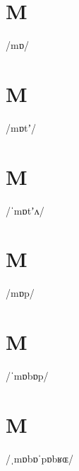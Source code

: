 \documentclass[10pt,a4paper,twoside]{book}
\begin{document}
\section*{M}

\begin{multicols}{3}
 {/mɒ/} {}
\end{multicols}

\section*{M}

\begin{multicols}{3}
 {/mɒtʼ/} {}
\end{multicols}

\section*{M}

\begin{multicols}{3}
 {/ˈmɒtʼʌ/} {}
\end{multicols}

\section*{M}

\begin{multicols}{3}
 {/mɒp/} {}
\end{multicols}

\section*{M}

\begin{multicols}{3}
 {/ˈmɒbɒp/} {}
\end{multicols}

\section*{M}

\begin{multicols}{3}
 {/ˌmɒbɒˈpɒbʁɶ/} {}
\end{multicols}
\end{document}
